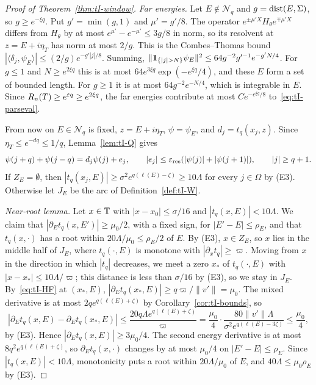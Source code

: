 \begin{proof}[Proof of Theorem~\ref{thm:tI-window}]
\emph{Far energies.} Let $E\notin\mathcal N_q$ and $g=\operatorname{dist}(E,\Sigma)$, so $g\ge e^{-\xi q}$. Put $g'=\min(g,1)$ and $\mu'=g'/8$. The operator $e^{\pm\mu'X}H_\theta e^{\mp\mu'X}$ differs from $H_\theta$ by at most $e^{\mu'}-e^{-\mu'}\le3g/8$ in norm, so its resolvent at $z=E+i\eta_T$ has norm at most $2/g$. This is the Combes--Thomas bound $|\langle\delta_j,\psi_E\rangle|\le(2/g)e^{-g'|j|/8}$. Summing, $\|\un_{\{|j|>N\}}\psi_E\|^2\le64g^{-2}g'^{-1}e^{-g'N/4}$. For $g\le1$ and $N\ge e^{2\xi q}$ this is at most $64e^{3\xi q}\exp(-e^{\xi q}/4)$, and these $E$ form a set of bounded length. For $g\ge1$ it is at most $64g^{-2}e^{-N/4}$, which is integrable in $E$. Since $R_n(T)\ge e^{\varepsilon q}\ge e^{2\xi q}$, the far energies contribute at most $Ce^{-e^{\xi q}/8}$ to~\eqref{eq:tI-parseval}.

From now on $E\in\mathcal N_q$ is fixed, $z=E+i\eta_T$, $\psi=\psi_E$, and $d_j=t_q(x_j,z)$. Since $\eta_T\le e^{-dq}\le1/q$, Lemma~\ref{lem:tI-Q} gives
\begin{equation}\label{eq:tI-rec}
\psi(j+q)+\psi(j-q)=d_j\psi(j)+e_j,\qquad|e_j|\le\varepsilon_{\mathrm{res}}(|\psi(j)|+|\psi(j+1)|),\qquad|j|\ge q+1.
\end{equation}
If $Z_E=\emptyset$, then $|t_q(x_j,E)|\ge\sigma^2e^{q(\ell(E)-\zeta)}\ge10\Lambda$ for every $j\in\Omega$ by (E3). Otherwise let $J_E$ be the arc of Definition~\ref{def:tI-W}.

\emph{Near-root lemma.} Let $x\in\mathbb T$ with $|x-x_0|\le\sigma/16$ and $|t_q(x,E)|<10\Lambda$. We claim that $|\partial_Et_q(x,E')|\ge\mu_0/2$, with a fixed sign, for $|E'-E|\le\rho_E$, and that $t_q(x,\cdot)$ has a root within $20\Lambda/\mu_0\le\rho_E/2$ of $E$. By (E3), $x\in Z_E$, so $x$ lies in the middle half of $J_E$, where $t_q(\cdot,E)$ is monotone with $|\partial_xt_q|\ge\varpi$. Moving from $x$ in the direction in which $|t_q|$ decreases, we meet a zero $x_*$ of $t_q(\cdot,E)$ with $|x-x_*|\le10\Lambda/\varpi$; this distance is less than $\sigma/16$ by (E3), so we stay in $J_E$. By~\eqref{eq:tI-HF} at $(x_*,E)$, $|\partial_Et_q(x_*,E)|\ge q\varpi/\|v'\|=\mu_0$. The mixed derivative is at most $2qe^{q(\ell(E)+\zeta)}$ by Corollary~\ref{cor:tI-bounds}, so
\[
|\partial_Et_q(x,E)-\partial_Et_q(x_*,E)|\le\frac{20q\Lambda e^{q(\ell(E)+\zeta)}}{\varpi}=\frac{\mu_0}{4}\cdot\frac{80\|v'\|\Lambda}{\sigma^2e^{q(\ell(E)-3\zeta)}}\le\frac{\mu_0}4,
\]
by (E3). Hence $|\partial_Et_q(x,E)|\ge3\mu_0/4$. The second energy derivative is at most $8q^2e^{q(\ell(E)+\zeta)}$, so $\partial_Et_q(x,\cdot)$ changes by at most $\mu_0/4$ on $|E'-E|\le\rho_E$. Since $|t_q(x,E)|<10\Lambda$, monotonicity puts a root within $20\Lambda/\mu_0$ of $E$, and $40\Lambda\le\mu_0\rho_E$ by (E3).


\end{proof}
